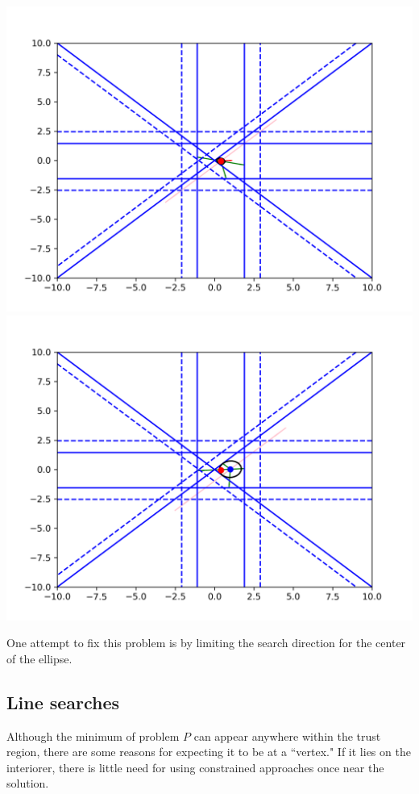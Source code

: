\documentclass{article}
\begin{document}
\includegraphics[scale=0.4]{everything_runs_1.png}
\includegraphics[scale=0.4]{everything_runs_2.png}


One attempt to fix this problem is by limiting the search direction for the center of the ellipse.

\subsection{Line searches}
Although the minimum of problem $P$ can appear anywhere within the trust region, there are some reasons for expecting it to be at a ``vertex."
If it lies on the interiorer, there is little need for using constrained approaches once near the solution.
\end{document}
